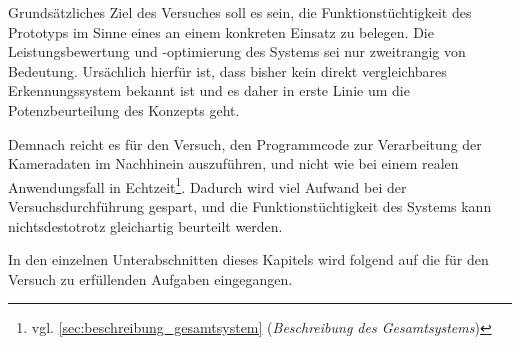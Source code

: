 Grundsätzliches Ziel des Versuches soll es sein, die Funktionstüchtigkeit des Prototyps im Sinne eines  an einem konkreten Einsatz zu belegen. Die Leistungsbewertung und -optimierung des Systems sei nur zweitrangig von Bedeutung. Ursächlich hierfür ist, dass bisher kein direkt vergleichbares Erkennungssystem bekannt ist und es daher in erste Linie um die Potenzbeurteilung des Konzepts geht.\kleinerabstand

\noindent Demnach reicht es für den Versuch, den Programmcode zur Verarbeitung der Kameradaten im Nachhinein auszuführen, und nicht wie bei einem realen Anwendungsfall in Echtzeit\footnote{vgl. \ref{sec:beschreibung_gesamtsystem} (\emph{Beschreibung des Gesamtsystems})}. Dadurch wird viel Aufwand bei der Versuchsdurchführung gespart, und die Funktionstüchtigkeit des Systems kann nichtsdestotrotz gleichartig beurteilt werden.\kleinerabstand

In den einzelnen Unterabschnitten dieses Kapitels wird folgend auf die für den Versuch zu erfüllenden Aufgaben eingegangen.
